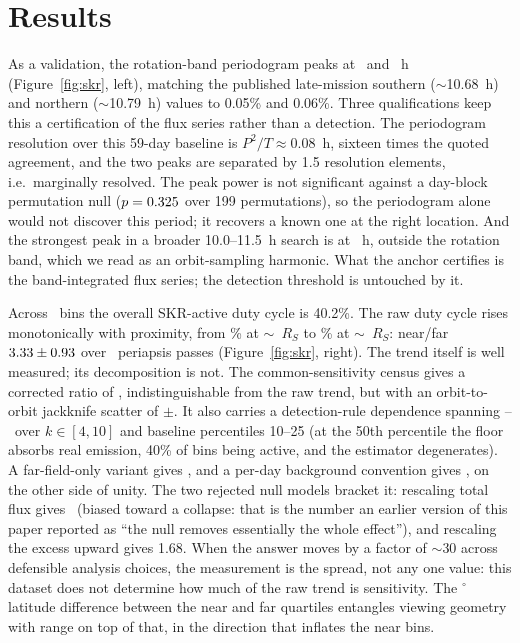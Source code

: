 \documentclass[twocolumn]{aastex631}
\begin{document}
\section{Results}
\label{sec:results}
As a validation, the rotation-band periodogram peaks at \skrRealAnchorPeriod\ and
\skrRealPeriodTwo~h (Figure~\ref{fig:skr}, left), matching the published late-mission southern
($\sim$10.68~h) and northern ($\sim$10.79~h) values \citep{provan2019} to 0.05\% and 0.06\%.
Three qualifications keep this a certification of the flux series rather than a detection. The
periodogram resolution over this 59-day baseline is $P^2/T \approx 0.08$~h, sixteen times the
quoted agreement, and the two peaks are separated by 1.5 resolution elements, i.e.\ marginally
resolved. The peak power is not significant against a day-block permutation null
($p=0.325$ over 199 permutations), so the periodogram alone would not discover this
period; it recovers a known one at the right location. And the strongest peak in a broader
10.0--11.5~h search is at \skrRealBroadPeak~h, outside the rotation band, which we read as an
orbit-sampling harmonic. What the anchor certifies is the band-integrated flux series; the
detection threshold is untouched by it.

Across \skrNBins\ bins the overall SKR-active duty cycle is 40.2\%. The raw duty cycle
rises monotonically with proximity, from \skrRealDutyFar\% at $\sim$\skrRealRangeFar~$R_S$ to
\skrRealDutyNear\% at $\sim$\skrRealRangeNear~$R_S$: near/far
$3.33\pm0.93$ over \skrRealNOrbits\ periapsis passes
(Figure~\ref{fig:skr}, right). The trend itself is well measured; its decomposition is not. The
common-sensitivity census gives a corrected ratio of \skrRealSensCorrNearFar,
indistinguishable from the raw trend, but with an orbit-to-orbit jackknife scatter of
$\pm$\skrRealCorrNearFarJkSe. It also carries a detection-rule dependence spanning
\skrRealSweepMin--\skrRealSweepMax\ over $k\in[4,10]$ and baseline percentiles 10--25 (at the
50th percentile the floor absorbs real emission, 40\% of bins being active, and the estimator
degenerates). A far-field-only variant gives \skrRealCorrNearFarFarField, and a per-day
background convention gives \skrRealCorrNearFarPerDay, on the other side of unity. The two
rejected null models
bracket it: rescaling total flux gives \skrRealCorrNearFarFluxScaled\ (biased toward a collapse:
that is the number an earlier version of this paper reported as ``the null removes essentially
the whole effect''), and rescaling the excess upward gives 1.68. When the answer moves by a
factor of $\sim$30 across defensible analysis choices, the measurement is the spread, not any
one value: this dataset does not determine how much of the raw trend is sensitivity. The
\skrRealAbsLatSpan$^\circ$ latitude difference between the near and far quartiles
\citep{lamy2008} entangles viewing geometry with range on top of that, in the direction that
inflates the near bins.
\end{document}
